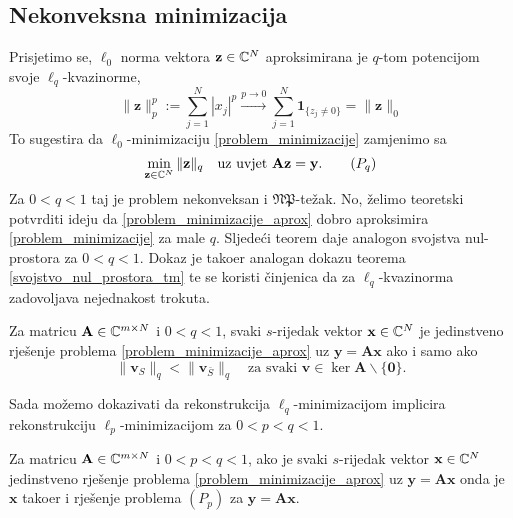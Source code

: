 \documentclass[a4paper,twoside,12pt]{memoir} %
\newcommand{\vect}[1]{\mathbf{#1}}
\renewcommand{\vec}{\vect}
\newcommand{\norm}[1]{\|{#1}\|}
\begin{document}
\subsection[Nekonveksna minimizacija][Nekonveksna minimizacija]{Nekonveksna minimizacija}
Prisjetimo se, $\ell_0$ norma vektora $\vec z \in \C^N$ aproksimirana je $q$-tom potencijom svoje $\ell_q$-kvazinorme,
\begin{equation*}
\|\vec{z}\|_p^p := \sum_{j=1}^N|x_j|^p \xrightarrow{p\rightarrow 0} \sum_{j=1}^N\mathbf{1}_{\{z_j \neq 0\}} = \|\vec{z}\|_0
\end{equation*}
To sugestira da $\ell_0$-minimizaciju \eqref{problem_minimizacije} zamjenimo sa
\begin{equation}
    \min_{\vec z \in \C^N} \norm{\vec z}_q \quad \text{uz uvjet }\vec{Az} = \vec{y}.\tag{$P_q$}
\end{equation}
Za $0 < q < 1$ taj je problem nekonveksan i $\mathfrak{NP}$-te\v{z}ak. No, \v{z}elimo teoretski potvrditi ideju da \eqref{problem_minimizacije_aprox} dobro aproksimira \eqref{problem_minimizacije} za male $q$.
Sljede\'ci teorem daje analogon svojstva nul-prostora za $0<q<1$. Dokaz je tako\dj er analogan dokazu teorema \ref{svojstvo_nul_prostora_tm} te se koristi \v{c}injenica da za $\ell_q$-kvazinorma zadovoljava nejednakost trokuta.  
\begin{thm}\label{svojstvo_nul_prostora_tm_2}
    Za matricu $\vec A \in \C^{m \times N}$ i $0<q<1$, svaki $s$-rijedak vektor $\vec x \in \C^N$ je jedinstveno rje\v{s}enje problema \eqref{problem_minimizacije_aprox} uz $\vec y = \vec{Ax}$ ako i samo ako 
    \begin{equation*}
        \norm{\vec v_S}_q < \norm{\vec v_{\bar{S}}}_q  \quad \text{za svaki }\vec v \in \ker \vec A \backslash \{\vec 0\}.
    \end{equation*}
\end{thm}
Sada mo\v{z}emo dokazivati da rekonstrukcija $\ell_q$-minimizacijom implicira rekonstrukciju $\ell_p$-minimizacijom za $0<p<q<1$.
\begin{thm}
    Za matricu $\vec A \in \C^{m \times N}$ i $0<p<q<1$, ako je svaki $s$-rijedak vektor $\vec x \in \C^N$ jedinstveno rje\v{s}enje problema \eqref{problem_minimizacije_aprox} uz $\vec y = \vec{Ax}$  onda je $\vec x$ tako\dj er i rje\v{s}enje problema $(P_p)$ za $\vec y = \vec{Ax}$.
\end{thm}
\end{document}
